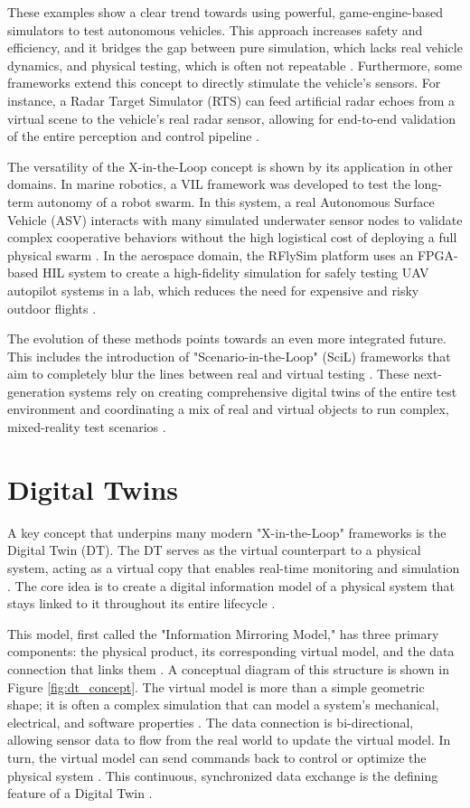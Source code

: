 These examples show a clear trend towards using powerful, game-engine-based simulators to test autonomous vehicles. This approach increases safety and efficiency, and it bridges the gap between pure simulation, which lacks real vehicle dynamics, and physical testing, which is often not repeatable \cite{Cao2023}. Furthermore, some frameworks extend this concept to directly stimulate the vehicle's sensors. For instance, a Radar Target Simulator (RTS) can feed artificial radar echoes from a virtual scene to the vehicle's real radar sensor, allowing for end-to-end validation of the entire perception and control pipeline \cite{Diewald2021}.


The versatility of the X-in-the-Loop concept is shown by its application in other domains. In marine robotics, a VIL framework was developed to test the long-term autonomy of a robot swarm. In this system, a real Autonomous Surface Vehicle (ASV) interacts with many simulated underwater sensor nodes to validate complex cooperative behaviors without the high logistical cost of deploying a full physical swarm \cite{Babic2020}. In the aerospace domain, the RFlySim platform uses an FPGA-based HIL system to create a high-fidelity simulation for safely testing UAV autopilot systems in a lab, which reduces the need for expensive and risky outdoor flights \cite{Dai2021}.

The evolution of these methods points towards an even more integrated future. This includes the introduction of "Scenario-in-the-Loop" (SciL) frameworks that aim to completely blur the lines between real and virtual testing \cite{Szalay2021}. These next-generation systems rely on creating comprehensive digital twins of the entire test environment and coordinating a mix of real and virtual objects to run complex, mixed-reality test scenarios \cite{Szalay2021}.

\section{Digital Twins}
\label{sec:DT}
A key concept that underpins many modern "X-in-the-Loop" frameworks is the Digital Twin (DT). The DT serves as the virtual counterpart to a physical system, acting as a virtual copy that enables real-time monitoring and simulation \cite{AA23}. The core idea is to create a digital information model of a physical system that stays linked to it throughout its entire lifecycle \cite{Grieves2017}.

This model, first called the "Information Mirroring Model," has three primary components: the physical product, its corresponding virtual model, and the data connection that links them \cite{Grieves2017, AA23}. A conceptual diagram of this structure is shown in Figure \ref{fig:dt_concept}. The virtual model is more than a simple geometric shape; it is often a complex simulation that can model a system's mechanical, electrical, and software properties \cite{Leng2021}. The data connection is bi-directional, allowing sensor data to flow from the real world to update the virtual model. In turn, the virtual model can send commands back to control or optimize the physical system \cite{Grieves2017, Leng2021}. This continuous, synchronized data exchange is the defining feature of a Digital Twin \cite{AA23}.

